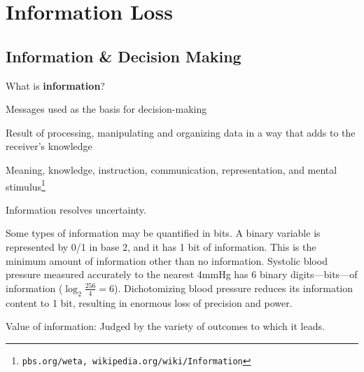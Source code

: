 
\chapter{Information Loss}


\section{Information \& Decision Making}
What is \textbf{information}?
\bi
\item Messages used as the basis for decision-making
\item Result of processing, manipulating and organizing data in a way
  that adds to the receiver's knowledge
\item Meaning, knowledge, instruction, communication, representation,
and mental stimulus\footnote{\texttt{pbs.org/weta, wikipedia.org/wiki/Information}}
\ei

Information resolves uncertainty.

Some types of information may be quantified in bits.  A binary
variable is represented by 0/1 in base 2, and it has 1 bit of
information.  This is the minimum amount of information other than no
information.  Systolic blood pressure measured accurately to the
nearest 4mmHg has 6 binary digits---bits---of information
($\log_{2}\frac{256}{4} = 6$).
Dichotomizing blood pressure reduces its information content to 1 bit,
resulting in enormous loss of precision and power.

Value of information: Judged by the variety of outcomes to which it
leads.

